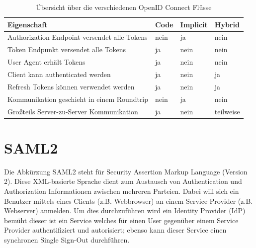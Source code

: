 \begin{table}
	\begin{center}
\begin{tabular}{llll}
	\toprule
	Eigenschaft & Code & Implicit & Hybrid \\
	\midrule
	Authorization Endpoint versendet alle Tokens & nein & ja   & nein \\
	Token Endpunkt versendet alle Tokens			   & ja   & nein & nein \\
	User Agent erhält Tokens                     & ja   & nein & nein \\
	Client kann authenticated werden             & ja   & nein & ja \\
	Refresh Tokens können verwendet werden       & ja   & nein & ja \\
	Kommunikation geschieht in einem Roundtrip   & nein & ja   & nein \\
	Großteils Server-zu-Server Kommunikation     & ja   & nein & teilweise \\
	\bottomrule
\end{tabular}
\end{center}
	\caption{Übersicht über die verschiedenen OpenID Connect Flüsse}
	\label{tbl:oidc}
\end{table}

\section{SAML2}

Die Abkürzung SAML2 steht für Security Assertion Markup Language (Version 2). Diese XML-basierte Sprache dient zum Austausch von Authentication und Authorization Informationen zwischen mehreren Parteien. Dabei will sich ein Benutzer mittels eines Clients (z.B. Webbrowser) an einem Service Provider (z.B. Webserver) anmelden. Um dies durchzuführen wird ein Identity Provider (IdP) bemüht dieser ist ein Service welches für einen User gegenüber einem Service Provider authentifiziert und autorisiert; ebenso kann dieser Service einen synchronen Single Sign-Out durchführen.

